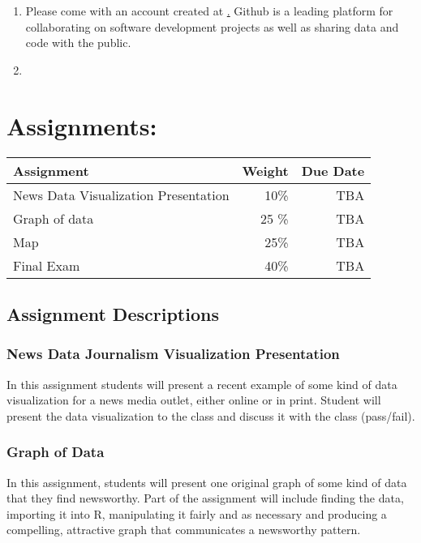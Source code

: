 \documentclass{article}
\begin{document}
\begin{enumerate}

\item Please come with an account created at \href{http://www.github.com}. Github is a leading platform for collaborating on software development projects as well as sharing data and code with the public.  
\item 

\end{enumerate}

\section*{Assignments:}
\begin{table}[ht]
\center
\begin{tabular}{lrr}
Assignment & Weight & Due Date\\
\hline
News Data Visualization Presentation& 10\%	& TBA\\
Graph of data 			&25 \% & TBA\\
Map 		& 25\% 		& TBA \\
Final Exam & 40\%  & TBA\\


\end{tabular}
\end{table}

\subsection*{Assignment Descriptions}
\subsubsection*{News Data Journalism Visualization Presentation}
In this assignment students will present a recent example of some kind of data visualization for a news media outlet, either online or in print. Student will present the data visualization to the class and discuss it with the class (pass/fail). 

\subsubsection*{Graph of Data}
In this assignment, students will present one original graph of some kind of data that they find newsworthy. Part of the assignment will include finding the data, importing it into R, manipulating it fairly and as necessary and producing a compelling, attractive graph that communicates a newsworthy pattern. 
\end{document}
